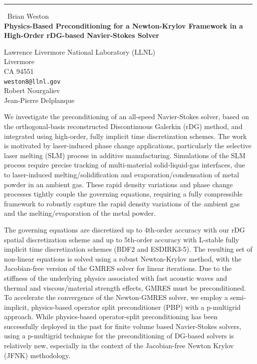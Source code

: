 \documentclass{report}
\begin{document}
\begin{center}
\rule{6in}{1pt} \
{\large Brian Weston \\
{\bf Physics-Based Preconditioning for a Newton-Krylov Framework in a High-Order rDG-based Navier-Stokes Solver }}

Lawrence Livermore National Laboratory (LLNL) \\ Livermore \\ CA 94551
\\
{\tt weston8@llnl.gov}\\
Robert Nourgaliev\\
Jean-Pierre Delplanque\end{center}

We investigate the preconditioning of an all-speed Navier-Stokes solver,
based on the orthogonal-basis reconstructed Discontinuous Galerkin (rDG)
method, and integrated using high-order, fully implicit time
discretization schemes. The work is motivated by laser-induced phase
change applications, particularly the selective laser melting (SLM)
process in additive manufacturing. Simulations of the SLM process require
precise tracking of multi-material solid-liquid-gas interfaces, due to
laser-induced melting/solidification and evaporation/condensation of
metal powder in an ambient gas. These rapid density variations and phase
change processes tightly couple the governing equations, requiring a
fully compressible framework to robustly capture the rapid density
variations of the ambient gas and the melting/evaporation of the metal
powder.

The governing equations are discretized up to 4th-order accuracy with our
rDG spatial discretization scheme and up to 5th-order accuracy with
L-stable fully implicit time discretization schemes (BDF2 and ESDIRK3-5).
The resulting set of non-linear equations is solved using a robust
Newton-Krylov method, with the Jacobian-free version of the GMRES solver
for linear iterations. Due to the stiffness of the underlying physics
associated with fast acoustic waves and thermal and viscous/material
strength effects, GMRES must be preconditioned.
To accelerate the convergence of the Newton-GMRES solver, we employ a
semi-implicit, physics-based operator split preconditioner (PBP) with a
p-multigrid approach. While physics-based operator-split preconditioning
has been successfully deployed in the past for finite volume based
Navier-Stokes solvers, using a p-multigrid technique for the
preconditioning of DG-based solvers is relatively new, especially in the
context of the Jacobian-free Newton Krylov (JFNK) methodology.
\end{document}
